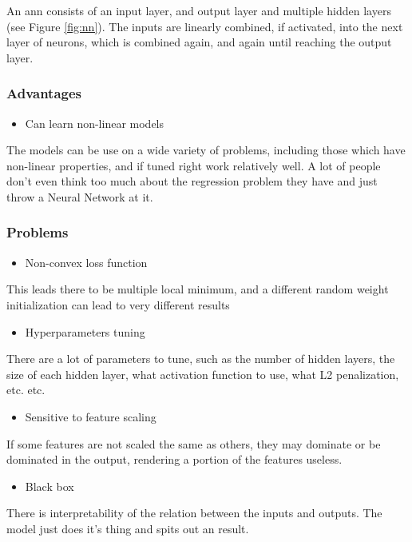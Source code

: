 An \acrshort{ann} consists of an input layer, and output layer and multiple hidden layers (see Figure \ref{fig:nn}). The inputs are linearly combined, if activated, into the next layer of neurons, which is combined again, and again until reaching the output layer.

\subsubsection{Advantages}
\begin{itemize}
\item Can learn non-linear models
\end{itemize}
The models can be use on a wide variety of problems, including those which have non-linear properties, and if tuned right work relatively well. A lot of people don't even think too much about the regression problem they have and just throw a Neural Network at it.

\subsubsection{Problems}
\begin{itemize}
\item Non-convex loss function
\end{itemize}
This leads there to be multiple local minimum, and a different random weight initialization can lead to very different results

\begin{itemize}
\item Hyperparameters tuning
\end{itemize}
There are a lot of parameters to tune, such as the number of hidden layers, the size of each hidden layer, what activation function to use, what L2 penalization, etc. etc.
\begin{itemize}
\item Sensitive to feature scaling
\end{itemize}
If some features are not scaled the same as others, they may dominate or be dominated in the output, rendering a portion of the features useless.
\begin{itemize}
\item Black box
\end{itemize}
There is interpretability of the relation between the inputs and outputs. The model just does it's thing and spits out an result.